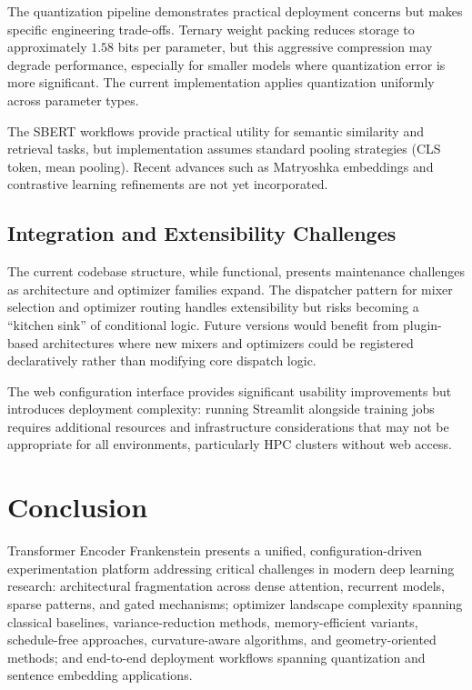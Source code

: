 \documentclass[11pt,a4paper]{article}
\begin{document}
The quantization pipeline demonstrates practical deployment concerns but makes specific engineering trade-offs. Ternary weight packing reduces storage to approximately $1.58$ bits per parameter, but this aggressive compression may degrade performance, especially for smaller models where quantization error is more significant. The current implementation applies quantization uniformly across parameter types.

The SBERT workflows provide practical utility for semantic similarity and retrieval tasks, but implementation assumes standard pooling strategies (CLS token, mean pooling). Recent advances such as Matryoshka embeddings \citep{muennighoff_matryoshka_2021} and contrastive learning refinements \citep{chen_supervised_2020} are not yet incorporated.

\subsection{Integration and Extensibility Challenges}

The current codebase structure, while functional, presents maintenance challenges as architecture and optimizer families expand. The dispatcher pattern for mixer selection and optimizer routing handles extensibility but risks becoming a ``kitchen sink'' of conditional logic. Future versions would benefit from plugin-based architectures where new mixers and optimizers could be registered declaratively rather than modifying core dispatch logic.

The web configuration interface provides significant usability improvements but introduces deployment complexity: running Streamlit alongside training jobs requires additional resources and infrastructure considerations that may not be appropriate for all environments, particularly HPC clusters without web access.

\section{Conclusion}
\label{sec:conclusion}

Transformer Encoder Frankenstein presents a unified, configuration-driven experimentation platform addressing critical challenges in modern deep learning research: architectural fragmentation across dense attention, recurrent models, sparse patterns, and gated mechanisms; optimizer landscape complexity spanning classical baselines, variance-reduction methods, memory-efficient variants, schedule-free approaches, curvature-aware algorithms, and geometry-oriented methods; and end-to-end deployment workflows spanning quantization and sentence embedding applications.
\end{document}
